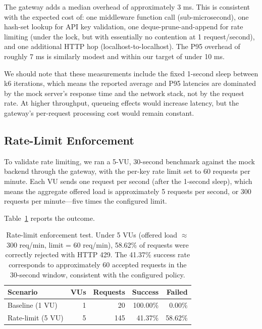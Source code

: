 \documentclass[10pt,journal]{IEEEtran}
\begin{document}
The gateway adds a median overhead of approximately 3 ms. This is consistent with the expected cost of: one middleware function call (sub-microsecond), one hash-set lookup for API key validation, one deque-prune-and-append for rate limiting (under the lock, but with essentially no contention at 1 request/second), and one additional HTTP hop (localhost-to-localhost). The P95 overhead of roughly 7 ms is similarly modest and within our target of under 10 ms.

We should note that these measurements include the fixed 1-second sleep between k6 iterations, which means the reported average and P95 latencies are dominated by the mock server's response time and the network stack, not by the request rate. At higher throughput, queueing effects would increase latency, but the gateway's per-request processing cost would remain constant.

\subsection{Rate-Limit Enforcement}

To validate rate limiting, we ran a 5-VU, 30-second benchmark against the mock backend through the gateway, with the per-key rate limit set to 60 requests per minute. Each VU sends one request per second (after the 1-second sleep), which means the aggregate offered load is approximately 5 requests per second, or 300 requests per minute---five times the configured limit.

Table~\ref{tab:ratelimit} reports the outcome.

\begin{table}[t]
\centering
\caption{Rate-limit enforcement test. Under 5 VUs (offered load $\approx$ 300 req/min, limit = 60 req/min), 58.62\% of requests were correctly rejected with HTTP 429. The 41.37\% success rate corresponds to approximately 60 accepted requests in the 30-second window, consistent with the configured policy.}
\label{tab:ratelimit}
\begin{tabular}{lrrrr}
\toprule
\textbf{Scenario} & \textbf{VUs} & \textbf{Requests} & \textbf{Success} & \textbf{Failed} \\
\midrule
Baseline (1 VU)   & 1  & 20  & 100.00\% &  0.00\% \\
Rate-limit (5 VU) & 5  & 145 &  41.37\% & 58.62\% \\
\bottomrule
\end{tabular}
\end{table}
\end{document}
